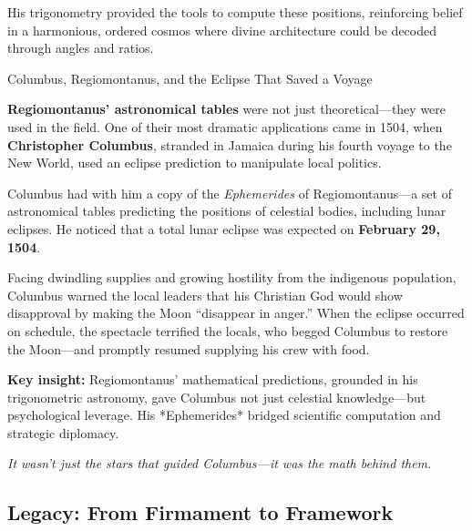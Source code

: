 His trigonometry provided the tools to compute these positions, reinforcing belief in a harmonious, ordered cosmos where divine architecture could be decoded through angles and ratios.

\medskip

\begin{HistoricalSidebar}{Columbus, Regiomontanus, and the Eclipse That Saved a Voyage}

  \textbf{Regiomontanus’ astronomical tables} were not just theoretical—they were used in the field. One of their most dramatic applications came in 1504, when \textbf{Christopher Columbus}, stranded in Jamaica during his fourth voyage to the New World, used an eclipse prediction to manipulate local politics.

  \medskip
  
  Columbus had with him a copy of the \textit{Ephemerides} of Regiomontanus—a set of astronomical tables predicting the positions of celestial bodies, including lunar eclipses. He noticed that a total lunar eclipse was expected on \textbf{February 29, 1504}.

  \medskip
  
  Facing dwindling supplies and growing hostility from the indigenous population, Columbus warned the local leaders that his Christian God would show disapproval by making the Moon “disappear in anger.” When the eclipse occurred on schedule, the spectacle terrified the locals, who begged Columbus to restore the Moon—and promptly resumed supplying his crew with food.
  
  \medskip
  
  \textbf{Key insight:} Regiomontanus’ mathematical predictions, grounded in his trigonometric astronomy, gave Columbus not just celestial knowledge—but psychological leverage. His *Ephemerides* bridged scientific computation and strategic diplomacy.

  \medskip
  
  \begin{center}
  \emph{It wasn’t just the stars that guided Columbus—it was the math behind them.}
  \end{center}
  
\end{HistoricalSidebar}

\medskip


\subsection{Legacy: From Firmament to Framework}

